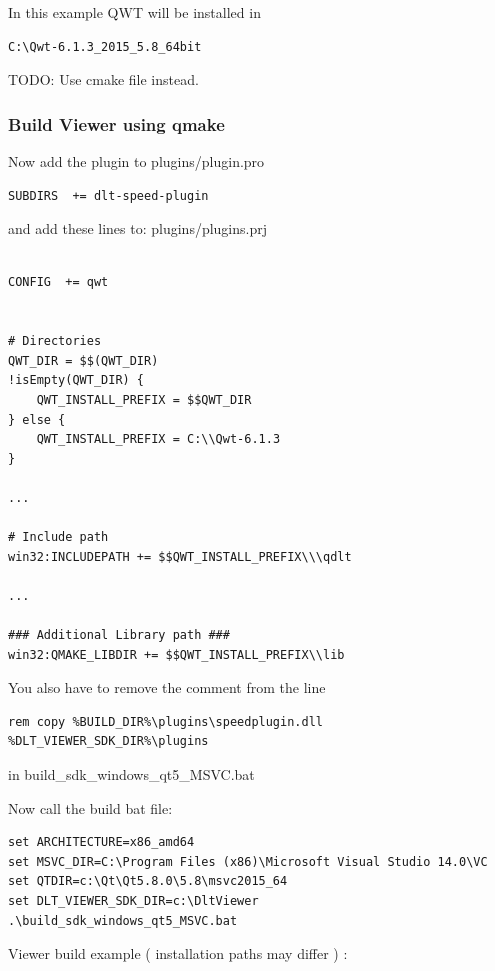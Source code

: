 \documentclass[a4paper,11pt]{article}
\begin{document}
In this example QWT will be installed in
\begin{verbatim}
C:\Qwt-6.1.3_2015_5.8_64bit
\end{verbatim}

TODO: Use cmake file instead.
\subsubsection{Build Viewer using qmake}

Now add the plugin to plugins/plugin.pro

\begin{verbatim}
SUBDIRS  += dlt-speed-plugin
\end{verbatim}

and add these lines to: plugins/plugins.prj

\begin{verbatim}

CONFIG  += qwt


# Directories
QWT_DIR = $$(QWT_DIR)
!isEmpty(QWT_DIR) {
    QWT_INSTALL_PREFIX = $$QWT_DIR
} else {
    QWT_INSTALL_PREFIX = C:\\Qwt-6.1.3
}

...

# Include path
win32:INCLUDEPATH += $$QWT_INSTALL_PREFIX\\\qdlt

...

### Additional Library path ###
win32:QMAKE_LIBDIR += $$QWT_INSTALL_PREFIX\\lib

\end{verbatim}

You also have to remove the comment from the line
\begin{verbatim}
rem copy %BUILD_DIR%\plugins\speedplugin.dll %DLT_VIEWER_SDK_DIR%\plugins
\end{verbatim}
in build\_sdk\_windows\_qt5\_MSVC.bat

Now call the build bat file:

\begin{verbatim}
set ARCHITECTURE=x86_amd64
set MSVC_DIR=C:\Program Files (x86)\Microsoft Visual Studio 14.0\VC
set QTDIR=c:\Qt\Qt5.8.0\5.8\msvc2015_64
set DLT_VIEWER_SDK_DIR=c:\DltViewer
.\build_sdk_windows_qt5_MSVC.bat
\end{verbatim}


Viewer build example ( installation paths may differ ) :
\end{document}
